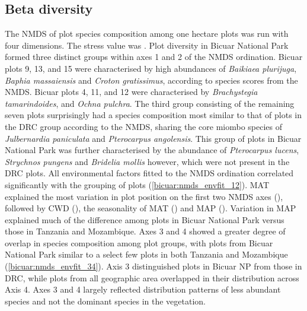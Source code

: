 \begin{refsection}
\subsection{Beta diversity}
\label{bicuar:ssec:beta}

The NMDS of plot species composition among one hectare plots was run with four dimensions. The stress value was \nmdsstress{}. Plot diversity in Bicuar National Park formed three distinct groups within axes 1 and 2 of the NMDS ordination. Bicuar plots 9, 13, and 15 were characterised by high abundances of \textit{Baikiaea plurijuga}, \textit{Baphia massaiensis} and \textit{Croton gratissimus}, according to species scores from the NMDS. Bicuar plots 4, 11, and 12 were characterised  by \textit{Brachystegia tamarindoides}, and \textit{Ochna pulchra}. The third group consisting of the remaining seven plots surprisingly had a species composition most similar to that of plots in the DRC group according to the NMDS, sharing the core miombo species of \textit{Julbernardia paniculata} and \textit{Pterocarpus angolensis}. This group of plots in Bicuar National Park was further characterised by the abundance of \textit{Pterocarpus lucens}, \textit{Strychnos pungens} and \textit{Bridelia mollis} however, which were not present in the DRC plots. All environmental factors fitted to the NMDS ordination correlated significantly with the grouping of plots (\autoref{bicuar:nmds_envfit_12}). MAT explained the most variation in plot position on the first two NMDS axes (\nmdsmat{}), followed by CWD (\nmdsmapsd{}), the seasonality of MAT (\nmdsmatsd{}) and MAP (\nmdsmap{}). Variation in MAP explained much of the difference among plots in Bicuar National Park versus those in Tanzania and Mozambique. Axes 3 and 4 showed a greater degree of overlap in species composition among plot groups, with plots from Bicuar National Park similar to a select few plots in both Tanzania and Mozambique (\autoref{bicuar:nmds_envfit_34}). Axis 3 distinguished plots in Bicuar NP from those in DRC, while plots from all geographic area overlapped in their distribution across Axis 4. Axes 3 and 4 largely reflected distribution patterns of less abundant species and not the dominant species in the vegetation.


\end{refsection}
